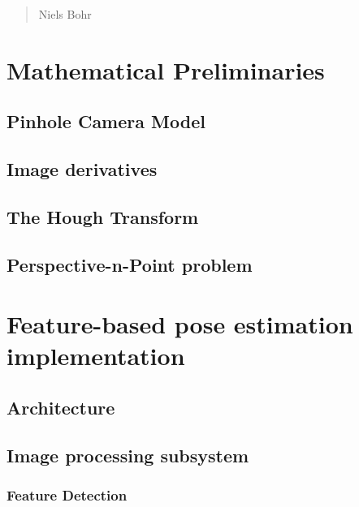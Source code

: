 \begin{quotation}
{\footnotesize
{}
\begin{flushright}
Niels Bohr
\end{flushright}
}
\end{quotation}
\vspace{0.5cm}

\section{Mathematical Preliminaries}

\subsection{Pinhole Camera Model}

\subsection{Image derivatives}

\subsection{The Hough Transform}

\subsection{Perspective-n-Point problem}

\section{Feature-based pose estimation implementation}

\subsection{Architecture}

\subsection{Image processing subsystem}

\subsubsection{Feature Detection}

